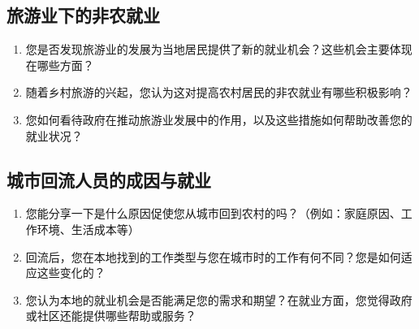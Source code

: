 \documentclass[12pt]{article}
\begin{document}
\subsection*{旅游业下的非农就业}
\begin{enumerate}
    \item 您是否发现旅游业的发展为当地居民提供了新的就业机会？这些机会主要体现在哪些方面？
    \item 随着乡村旅游的兴起，您认为这对提高农村居民的非农就业有哪些积极影响？
    \item 您如何看待政府在推动旅游业发展中的作用，以及这些措施如何帮助改善您的就业状况？
\end{enumerate}

\subsection*{城市回流人员的成因与就业}
\begin{enumerate}
    \item 您能分享一下是什么原因促使您从城市回到农村的吗？（例如：家庭原因、工作环境、生活成本等）
    \item 回流后，您在本地找到的工作类型与您在城市时的工作有何不同？您是如何适应这些变化的？
    \item 您认为本地的就业机会是否能满足您的需求和期望？在就业方面，您觉得政府或社区还能提供哪些帮助或服务？
\end{enumerate}
\end{document}
